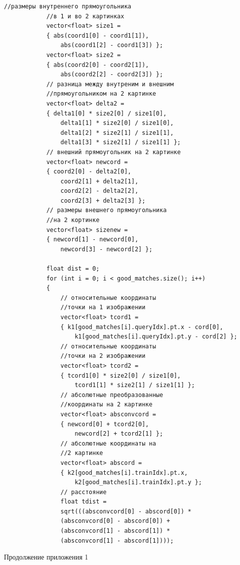 \documentclass[14pt, a4paper]{extreport}
\begin{document}
\begin{Verbatim}[fontseries=c, fontsize=\fontsize{10pt}{12pt}\selectfont]
			//размеры внутреннего прямоугольника 
			//в 1 и во 2 картинках
			vector<float> size1 = 
			{ abs(coord1[0] - coord1[1]),
				abs(coord1[2] - coord1[3]) };
			vector<float> size2 = 
			{ abs(coord2[0] - coord2[1]),
				abs(coord2[2] - coord2[3]) };
			// разница между внутреним и внешним 
			//прямоугольником на 2 картинке
			vector<float> delta2 = 
			{ delta1[0] * size2[0] / size1[0],
				delta1[1] * size2[0] / size1[0],
				delta1[2] * size2[1] / size1[1],
				delta1[3] * size2[1] / size1[1] };
			// внешний прямоугольник на 2 картинке
			vector<float> newcord = 
			{ coord2[0] - delta2[0],
				coord2[1] + delta2[1],
				coord2[2] - delta2[2],
				coord2[3] + delta2[3] };
			// размеры внешнего прямоугольника 
			//на 2 кортинке
			vector<float> sizenew = 
			{ newcord[1] - newcord[0],
				newcord[3] - newcord[2] };
			
			float dist = 0;
			for (int i = 0; i < good_matches.size(); i++)
			{
				// относительные координаты 
				//точки на 1 изображении
				vector<float> tcord1 = 
				{ k1[good_matches[i].queryIdx].pt.x - cord[0],
					k1[good_matches[i].queryIdx].pt.y - cord[2] };
				// относительные координаты 
				//точки на 2 изображении
				vector<float> tcord2 = 
				{ tcord1[0] * size2[0] / size1[0],
					tcord1[1] * size2[1] / size1[1] };
				// абсолютные преобразованные 
				//координаты на 2 картинке
				vector<float> absconvcord = 
				{ newcord[0] + tcord2[0],
					newcord[2] + tcord2[1] };
				// абсолютные координаты на 
				//2 картинке
				vector<float> abscord =
				{ k2[good_matches[i].trainIdx].pt.x,
					k2[good_matches[i].trainIdx].pt.y };
				// расстояние
				float tdist = 
				sqrt(((absconvcord[0] - abscord[0]) * 
				(absconvcord[0] - abscord[0]) +
				(absconvcord[1] - abscord[1]) *
				(absconvcord[1] - abscord[1])));
\end{Verbatim}
\begin{flushright} \noindent Продолжение приложения 1 \end{flushright}
\end{document}
